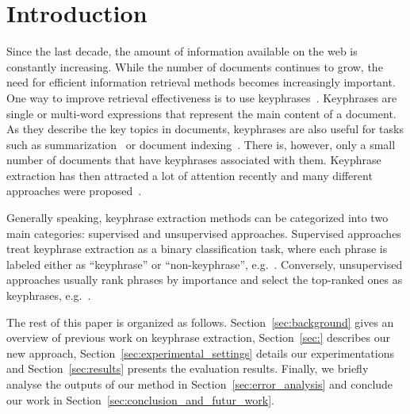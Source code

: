 \section{Introduction}
\label{sec:introduction}
  Since the last decade, the amount of information available on the web is
  constantly increasing. While the number of documents continues to grow, the
  need for efficient information retrieval methods becomes increasingly
  important. One way to improve retrieval effectiveness is to use
  keyphrases~\cite{jones1999phrasier}. Keyphrases are single or multi-word
  expressions that represent the main content of a document. As they describe
  the key topics in documents, keyphrases are also useful for tasks such as
  summarization~\cite{avanzo2005keyphrase} or document
  indexing~\cite{medelyan2008smalltrainingset}. There is, however, only a small
  number of documents that have keyphrases associated with them. Keyphrase
  extraction has then attracted a lot of attention recently and many different
  approaches were proposed~\cite{hasan2014state_of_the_art}.

  Generally speaking, keyphrase extraction methods can be categorized into two
  main categories: supervised and unsupervised approaches. Supervised approaches
  treat keyphrase extraction as a binary classification task, where each phrase
  is labeled either as ``keyphrase'' or ``non-keyphrase'',
  e.g.~\cite{witten1999kea}. Conversely, unsupervised approaches usually rank
  phrases by importance and select the top-ranked ones as keyphrases,
  e.g.~\cite{mihalcea2004textrank}.


  The rest of this paper is organized as follows. Section~\ref{sec:background}
  gives an overview of previous work on keyphrase extraction, Section~\ref{sec:}
  describes our new approach, Section~\ref{sec:experimental_settings} details
  our experimentations and Section~\ref{sec:results} presents the evaluation
  results. Finally, we briefly analyse the outputs of our method in
  Section~\ref{sec:error_analysis} and conclude our work in
  Section~\ref{sec:conclusion_and_futur_work}.

